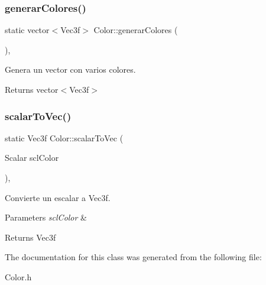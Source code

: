\subsubsection{\texorpdfstring{generar\+Colores()}{generarColores()}}
{\footnotesize\ttfamily static vector$<$Vec3f$>$ Color\+::generar\+Colores (\begin{DoxyParamCaption}{ }\end{DoxyParamCaption})\hspace{0.3cm}{\ttfamily [inline]}, {\ttfamily [static]}}



Genera un vector con varios colores. 

\begin{DoxyReturn}{Returns}
vector$<$\+Vec3f$>$ 
\end{DoxyReturn}
\mbox{\label{classColor_ae8b98ec693bfc1fde81e24f8e68a4b48}} 
\subsubsection{\texorpdfstring{scalar\+To\+Vec()}{scalarToVec()}}
{\footnotesize\ttfamily static Vec3f Color\+::scalar\+To\+Vec (\begin{DoxyParamCaption}\item[{Scalar}]{scl\+Color }\end{DoxyParamCaption})\hspace{0.3cm}{\ttfamily [inline]}, {\ttfamily [static]}}



Convierte un escalar a Vec3f. 


\begin{DoxyParams}{Parameters}
{\em scl\+Color} & \\
\hline
\end{DoxyParams}
\begin{DoxyReturn}{Returns}
Vec3f 
\end{DoxyReturn}


The documentation for this class was generated from the following file\+:\begin{DoxyCompactItemize}
\item 
Color.\+h\end{DoxyCompactItemize}
